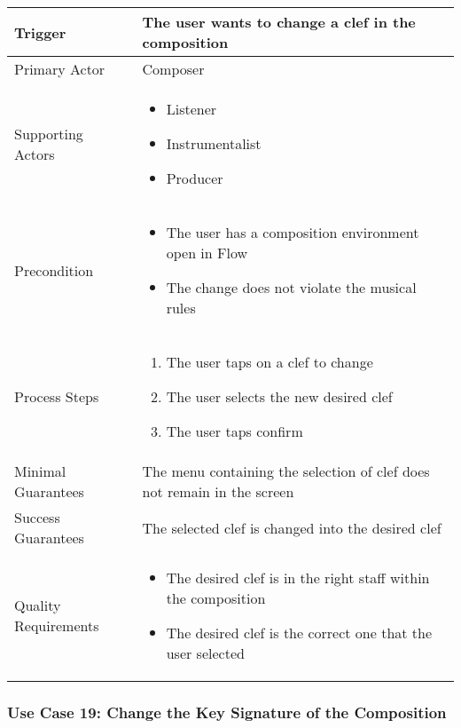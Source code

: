 \begin{tabularx}{\textwidth}{|X|X|}
\hline
Trigger & 
The user wants to change a clef in the composition \\
\hline
Primary Actor & 
Composer \\
\hline
Supporting Actors & 
\begin{itemize}
\item Listener
\item Instrumentalist
\item Producer
\end{itemize} \\
\hline
Precondition & 
\begin{itemize}
\item The user has a composition environment open in Flow
\item The change does not violate the musical rules
\end{itemize} \\
\hline
Process Steps & 
\begin{enumerate}
\item The user taps on a clef to change
\item The user selects the new desired clef
\item The user taps confirm
\end{enumerate} \\
\hline
Minimal Guarantees & 
The menu containing the selection of clef does not remain in the screen \\
\hline
Success Guarantees & 
The selected clef is changed into the desired clef \\
\hline
Quality Requirements & 
\begin{itemize}
\item The desired clef is in the right staff within the composition
\item The desired clef is the correct one that the user selected
\end{itemize} \\ 
\hline
\end{tabularx}

\subsubsection{Use Case 19: Change the Key Signature of the Composition}

